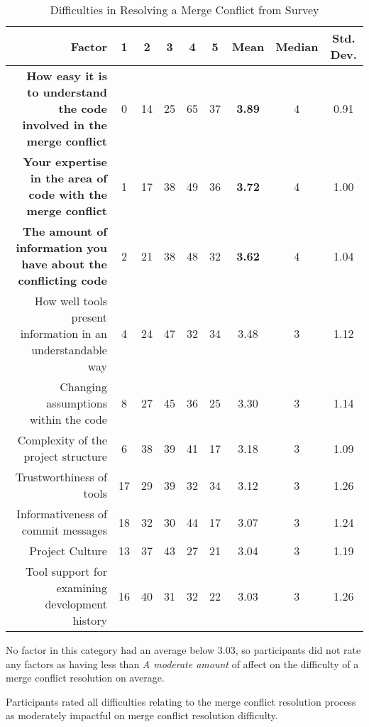 \begin{table*}[!]
\renewcommand{\arraystretch}{1.3}
\caption{Difficulties in Resolving a Merge Conflict from Survey}
\label{survey_res_diffs}
\centering
\begin{tabularx}{0.9\textwidth}{r | *5{c} | *3{c}}

\toprule
	Factor & 1 & 2 & 3 & 4 & 5 & Mean & Median & Std. Dev. \\
\midrule
	\textbf{How easy it is to understand the code involved in the merge conflict} & 0 & 14 & 25 & 65 & 37 & \textbf{3.89} & 4 & 0.91\\
	\textbf{Your expertise in the area of code with the merge conflict} & 1 & 17 & 38 & 49 & 36 & \textbf{3.72} & 4 & 1.00\\
	\textbf{The amount of information you have about the conflicting code} & 2 & 21 & 38 & 48 & 32 & \textbf{3.62} & 4 & 1.04\\
	How well tools present information in an understandable way & 4 & 24 & 47 & 32 & 34 & 3.48 & 3 & 1.12\\
	Changing assumptions within the code & 8 & 27 & 45 & 36 & 25 & 3.30 & 3 & 1.14\\
	Complexity of the project structure & 6 & 38 & 39 & 41 & 17 & 3.18 & 3 & 1.09\\
	Trustworthiness of tools & 17 & 29 & 39 & 32 & 34 & 3.12 & 3 & 1.26\\
	Informativeness of commit messages & 18 & 32 & 30 & 44 & 17 & 3.07 & 3 & 1.24\\
	Project Culture & 13 & 37 & 43 & 27 & 21 & 3.04 & 3 & 1.19\\
	Tool support for examining development history & 16 & 40 & 31 & 32 & 22 & 3.03 & 3 & 1.26\\
\bottomrule
\end{tabularx}
\end{table*}

No factor in this category had an average below 3.03, so participants did not rate any factors as having less than \textit{A moderate amount} of affect on the difficulty of a merge conflict resolution on average.

\begin{tcolorbox}[enhanced,minipage boxed title,enhanced,title={Takeaway \arabic{takeawaycounter}},
attach boxed title to top left=
{xshift=0mm,yshift=-1mm},
boxed title style={size=small}]
Participants rated all difficulties relating to the merge conflict resolution process as moderately impactful on merge conflict resolution difficulty.
\end{tcolorbox}
\addtocounter{takeawaycounter}{1}

